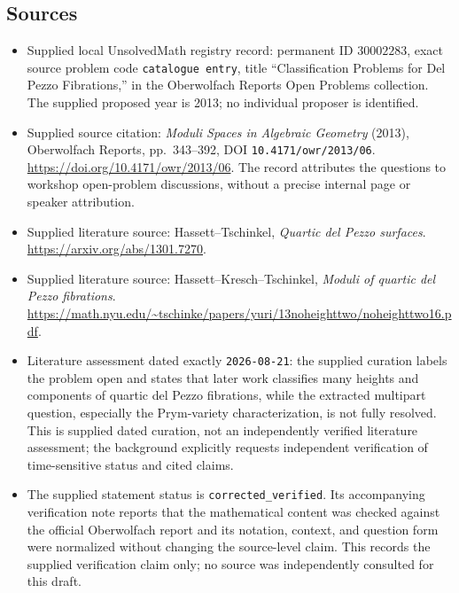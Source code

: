 \documentclass[11pt]{article}
\begin{document}
\subsection{Sources}
\begin{itemize}
\item Supplied local UnsolvedMath registry record: permanent ID \(30002283\), exact source problem code \texttt{catalogue entry}, title ``Classification Problems for Del Pezzo Fibrations,'' in the Oberwolfach Reports Open Problems collection. The supplied proposed year is 2013; no individual proposer is identified.
\item Supplied source citation: \emph{Moduli Spaces in Algebraic Geometry} (2013), Oberwolfach Reports, pp.\ 343--392, DOI \texttt{10.4171/owr/2013/06}. \url{https://doi.org/10.4171/owr/2013/06}. The record attributes the questions to workshop open-problem discussions, without a precise internal page or speaker attribution.
\item Supplied literature source: Hassett--Tschinkel, \emph{Quartic del Pezzo surfaces}. \url{https://arxiv.org/abs/1301.7270}.
\item Supplied literature source: Hassett--Kresch--Tschinkel, \emph{Moduli of quartic del Pezzo fibrations}. \url{https://math.nyu.edu/~tschinke/papers/yuri/13noheighttwo/noheighttwo16.pdf}.
\item Literature assessment dated exactly \texttt{2026-08-21}: the supplied curation labels the problem open and states that later work classifies many heights and components of quartic del Pezzo fibrations, while the extracted multipart question, especially the Prym-variety characterization, is not fully resolved. This is supplied dated curation, not an independently verified literature assessment; the background explicitly requests independent verification of time-sensitive status and cited claims.
\item The supplied statement status is \texttt{corrected\_verified}. Its accompanying verification note reports that the mathematical content was checked against the official Oberwolfach report and its notation, context, and question form were normalized without changing the source-level claim. This records the supplied verification claim only; no source was independently consulted for this draft.
\end{itemize}
\end{document}
